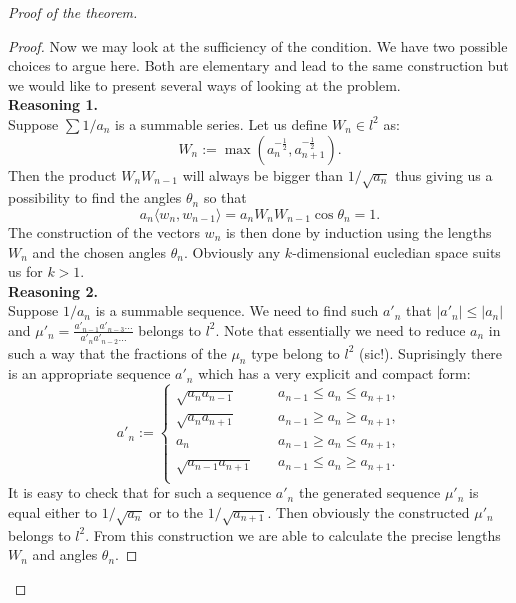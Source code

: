 \begin{proof}[Proof of the theorem]
\begin{proof}
            Now we may look at the sufficiency of the condition.
            We have two possible choices to argue here. Both are elementary and lead to the same construction but we would
            like to present several ways of looking at the problem.\\
            \textbf{Reasoning 1.}\\
            Suppose $\sum 1/a_n$ is a summable series. Let us define $W_n \in l^2$ as:
            $$
            W_n := \max(a_n^{-\frac{1}{2}}, a^{-\frac{1}{2}}_{n+1}).
            $$
            Then the product $W_nW_{n-1}$ will always be bigger than $1/\sqrt{a_n}$ thus giving us a possibility to
            find the angles $\theta_n$ so that 
            $$
            a_n \langle w_n, w_{n-1} \rangle = a_n W_n W_{n-1}\cos{\theta_n} = 1.
            $$
            The construction of the vectors $w_n$ is then done by induction using the lengths $W_n$ and the chosen
            angles $\theta_n$. Obviously any $k$-dimensional eucledian space suits us for $k > 1$.\\
            \textbf{Reasoning 2.}\\
            Suppose $1/a_n$ is a summable sequence. We need to find such $a'_n$ that $|a'_n| \leq |a_n|$ and
            $\mu'_n = \frac{a'_{n-1} a'_{n-3} \dots}{a'_{n} a'_{n-2} \dots }$ belongs to $l^2$. Note that essentially we need to reduce $a_n$ in such a way that the fractions of the $\mu_n$ type belong to $l^2$ (sic!). Suprisingly there is an appropriate sequence $a'_n$ which has a very explicit and compact form:
            \begin{equation*}
                a'_n := \begin{cases}
                    \sqrt{a_n a_{n-1}} & \quad a_{n-1} \leq a_n \leq a_{n+1},\\
                    \sqrt{a_n a_{n+1}} & \quad a_{n-1} \geq a_n \geq a_{n+1},\\
                    a_n & \quad a_{n-1} \geq a_n \leq a_{n+1},\\
                    \sqrt{a_{n-1} a_{n+1}} &\quad a_{n-1} \leq a_n \geq a_{n+1}.\\
                \end{cases}
            \end{equation*}
            It is easy to check that for such a sequence $a'_n$ the generated sequence $\mu'_n$ is equal either to $1/\sqrt{a_n}$ or to the $1/\sqrt{a_{n+1}}$. Then obviously the constructed $\mu'_n$ belongs to $l^2$.
            From this construction we are able to calculate the precise lengths $W_n$ and angles $\theta_n$.

\end{proof}
\end{proof}
